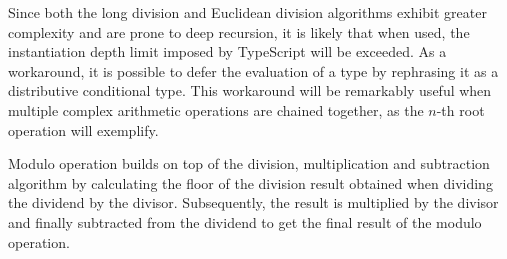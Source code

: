Since both the long division and Euclidean division algorithms exhibit greater complexity and are prone to deep recursion, it is likely that when used, the instantiation depth limit imposed by TypeScript will be exceeded. As a workaround, it is possible to defer the evaluation of a type by rephrasing it as a distributive conditional type. This workaround will be remarkably useful when multiple complex arithmetic operations are chained together, as the $n$-th root operation will exemplify.

Modulo operation builds on top of the division, multiplication and subtraction algorithm by calculating the floor of the division result obtained when dividing the dividend by the divisor. Subsequently, the result is multiplied by the divisor and finally subtracted from the dividend to get the final result of the modulo operation.